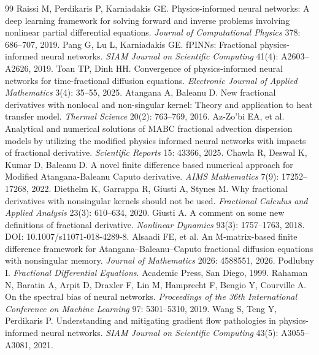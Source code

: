 \documentclass[11pt]{article}
\begin{document}
\begin{thebibliography}{99}
 Raissi M, Perdikaris P, Karniadakis GE. Physics-informed neural networks: A deep learning framework for solving forward and inverse problems involving nonlinear partial differential equations. \emph{Journal of Computational Physics} 378: 686--707, 2019.
 Pang G, Lu L, Karniadakis GE. fPINNs: Fractional physics-informed neural networks. \emph{SIAM Journal on Scientific Computing} 41(4): A2603--A2626, 2019.
 Toan TP, Dinh HH. Convergence of physics-informed neural networks for time-fractional diffusion equations. \emph{Electronic Journal of Applied Mathematics} 3(4): 35--55, 2025.
 Atangana A, Baleanu D. New fractional derivatives with nonlocal and non-singular kernel: Theory and application to heat transfer model. \emph{Thermal Science} 20(2): 763--769, 2016.
 Az-Zo'bi EA, et al. Analytical and numerical solutions of MABC fractional advection dispersion models by utilizing the modified physics informed neural networks with impacts of fractional derivative. \emph{Scientific Reports} 15: 43366, 2025.
 Chawla R, Deswal K, Kumar D, Baleanu D. A novel finite difference based numerical approach for Modified Atangana-Baleanu Caputo derivative. \emph{AIMS Mathematics} 7(9): 17252--17268, 2022.
 Diethelm K, Garrappa R, Giusti A, Stynes M. Why fractional derivatives with nonsingular kernels should not be used. \emph{Fractional Calculus and Applied Analysis} 23(3): 610--634, 2020.
 Giusti A. A comment on some new definitions of fractional derivative. \emph{Nonlinear Dynamics} 93(3): 1757--1763, 2018. DOI: 10.1007/s11071-018-4289-8.
 Alsaadi FE, et al. An M-matrix-based finite difference framework for Atangana--Baleanu--Caputo fractional diffusion equations with nonsingular memory. \emph{Journal of Mathematics} 2026: 4588551, 2026.
 Podlubny I. \emph{Fractional Differential Equations}. Academic Press, San Diego, 1999.
 Rahaman N, Baratin A, Arpit D, Draxler F, Lin M, Hamprecht F, Bengio Y, Courville A. On the spectral bias of neural networks. \emph{Proceedings of the 36th International Conference on Machine Learning} 97: 5301--5310, 2019.
 Wang S, Teng Y, Perdikaris P. Understanding and mitigating gradient flow pathologies in physics-informed neural networks. \emph{SIAM Journal on Scientific Computing} 43(5): A3055--A3081, 2021.
\end{thebibliography}
\end{document}

